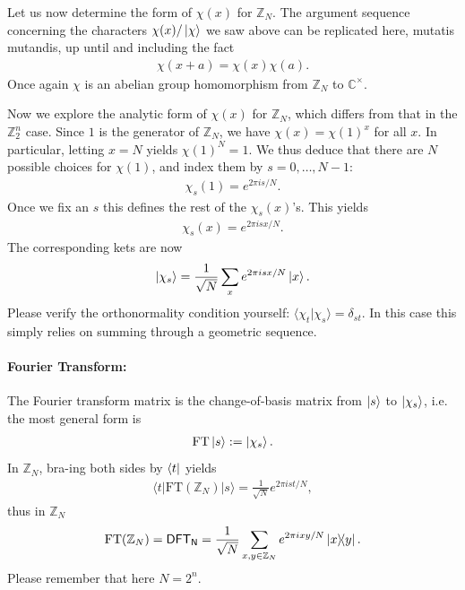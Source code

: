 Let us now determine the form of $\chi(x)$ for $\mathbb{Z}_N$. The argument sequence concerning the characters $\chi(x)/\ket{\chi}$ we saw above can be replicated here, mutatis mutandis, up until and including the fact
\begin{align*}
    \chi(x+a) = \chi(x)\chi(a).
\end{align*}
Once again $\chi$ is an abelian group homomorphism from $\mathbb{Z}_N$ to $\mathbb{C^\times}$.

Now we explore the analytic form of $\chi(x)$ for $\mathbb{Z}_N$, which differs from that in the $\mathbb{Z}_2^n$ case. Since $1$ is the generator of $\mathbb{Z}_N$, we have $\chi(x)=\chi(1)^x$ for all $x$. In particular, letting $x=N$ yields $\chi(1)^N=1$. We thus deduce that there are $N$ possible choices for $\chi(1)$, and index them by $s=0,\dots,N-1$:
\begin{align*}
    \chi_s(1) = e^{2\pi i s/N}.
\end{align*}
Once we fix an $s$ this defines the rest of the $\chi_s(x)$'s. This yields
\begin{align*}
    \chi_s(x) = e^{2\pi i sx/N}.
\end{align*}
The corresponding kets are now
\begin{align*}
    \ket{\chi_s} = \frac{1}{\sqrt{N}}\sum_x e^{2\pi i sx/N} \ket{x}.
\end{align*}
Please verify the orthonormality condition yourself: $\langle \chi_t|\chi_s \rangle = \delta_{st}$. In this case this simply relies on summing through a geometric sequence.

\paragraph{Fourier Transform:} The Fourier transform matrix is the change-of-basis matrix from $\ket{s}$ to $\ket{\chi_s}$, i.e. the most general form is
\begin{align*}
    \text{FT}\ket{s} := \ket{\chi_s}.
\end{align*}
In $\mathbb{Z}_N$, bra-ing both sides by $\bra{t}$ yields
\begin{align*}
    \langle t|\text{FT}(\mathbb{Z}_N)|s \rangle = \frac{1}{\sqrt{N}} e^{2\pi i st/N}, 
\end{align*}
thus in $\mathbb{Z}_N$
\begin{align*}
    \text{FT}(\mathbb{Z}_N) = \mathsf{DFT_N} = \frac{1}{\sqrt{N}} \sum_{x,y \in \mathbb{Z}_N} e^{2\pi i xy/N} \ketbra{x}{y}.
\end{align*}
Please remember that here $N=2^n$.

